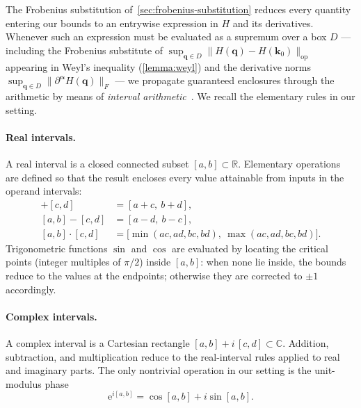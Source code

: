 \documentclass[11pt]{article}
\numberwithin{equation}{section}
\begin{document}
The Frobenius substitution of~\autoref{sec:frobenius-substitution} reduces
every quantity entering our bounds to an entrywise expression in \(H\) and its
derivatives. Whenever such an expression must be evaluated as a supremum over a
box \(D\) — including the Frobenius substitute of
\(\sup_{\mathbf{q} \in D} \|H(\mathbf{q}) - H(\mathbf{k}_0)\|_\mathrm{op}\)
appearing in Weyl's inequality (\autoref{lemma:weyl}) and the derivative norms
\(\sup_{\mathbf{q} \in D} \|\partial^{\bm\alpha} H(\mathbf{q})\|_F\) — we
propagate guaranteed enclosures through the arithmetic by means of
\emph{interval arithmetic}~\cite{moore2009introduction}. We recall the elementary
rules in our setting.

\paragraph{Real intervals.}
A real interval is a closed connected subset \([a, b] \subset \mathbb{R}\).
Elementary operations are defined so that the result encloses every value
attainable from inputs in the operand intervals:
\begin{align}
    [a, b] + [c, d]     & = [a + c,\ b + d],                                         \\
    [a, b] - [c, d]     & = [a - d,\ b - c],                                         \\
    [a, b] \cdot [c, d] & = \bigl[\min(ac, ad, bc, bd),\ \max(ac, ad, bc, bd)\bigr].
\end{align}
Trigonometric functions \(\sin\) and \(\cos\) are evaluated by locating the
critical points (integer multiples of \(\pi/2\)) inside \([a, b]\): when none
lie inside, the bounds reduce to the values at the endpoints; otherwise they
are corrected to \(\pm 1\) accordingly.

\paragraph{Complex intervals.}
A complex interval is a Cartesian rectangle
\([a, b] + i\,[c, d] \subset \mathbb{C}\). Addition, subtraction, and
multiplication reduce to the real-interval rules applied to real and imaginary
parts. The only nontrivial operation in our setting is the unit-modulus phase
\begin{equation}
    \mathrm{e}^{i [a, b]} = \cos[a, b] + i \sin[a, b].
\end{equation}
\end{document}
